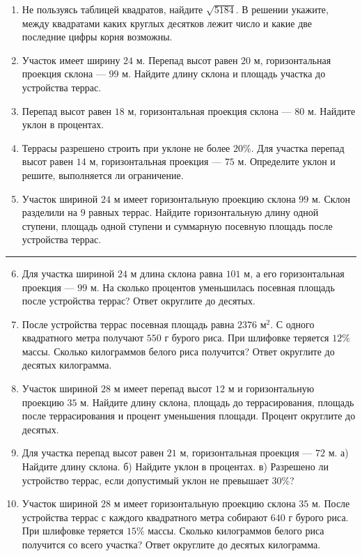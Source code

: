 \documentclass[a4paper,12pt]{article}
\newcommand{\topic}[1]{%
  \vspace{0.45em}\noindent{\Large\bfseries\color{darkaccent}#1}\par
  \vspace{0.25em}\noindent\color{linegray}\rule{\linewidth}{0.6pt}\color{textgray}\vspace{0.45em}
}
\begin{document}
\begin{enumerate}
  \item Не пользуясь таблицей квадратов, найдите \(\sqrt{5184}\). В решении укажите, между квадратами каких круглых десятков лежит число и какие две последние цифры корня возможны.

  \item Участок имеет ширину \(24\) м. Перепад высот равен \(20\) м, горизонтальная проекция склона --- \(99\) м. Найдите длину склона и площадь участка до устройства террас.

  \item Перепад высот равен \(18\) м, горизонтальная проекция склона --- \(80\) м. Найдите уклон в процентах.

  \item Террасы разрешено строить при уклоне не более \(20\%\). Для участка перепад высот равен \(14\) м, горизонтальная проекция --- \(75\) м. Определите уклон и решите, выполняется ли ограничение.

  \item Участок шириной \(24\) м имеет горизонтальную проекцию склона \(99\) м. Склон разделили на \(9\) равных террас. Найдите горизонтальную длину одной ступени, площадь одной ступени и суммарную посевную площадь после устройства террас.
\end{enumerate}

\clearpage
\topic{Тренировочный блок — продолжение}
\begin{enumerate}
  \setcounter{enumi}{5}
  \item Для участка шириной \(24\) м длина склона равна \(101\) м, а его горизонтальная проекция --- \(99\) м. На сколько процентов уменьшилась посевная площадь после устройства террас? Ответ округлите до десятых.

  \item После устройства террас посевная площадь равна \(2376\text{ м}^2\). С одного квадратного метра получают \(550\) г бурого риса. При шлифовке теряется \(12\%\) массы. Сколько килограммов белого риса получится? Ответ округлите до десятых килограмма.

  \item Участок шириной \(28\) м имеет перепад высот \(12\) м и горизонтальную проекцию \(35\) м. Найдите длину склона, площадь до террасирования, площадь после террасирования и процент уменьшения площади. Процент округлите до десятых.

  \item Для участка перепад высот равен \(21\) м, горизонтальная проекция --- \(72\) м. а) Найдите длину склона. б) Найдите уклон в процентах. в) Разрешено ли устройство террас, если допустимый уклон не превышает \(30\%\)?

  \item Участок шириной \(28\) м имеет горизонтальную проекцию склона \(35\) м. После устройства террас с каждого квадратного метра собирают \(640\) г бурого риса. При шлифовке теряется \(15\%\) массы. Сколько килограммов белого риса получится со всего участка? Ответ округлите до десятых килограмма.
\end{enumerate}
\end{document}
